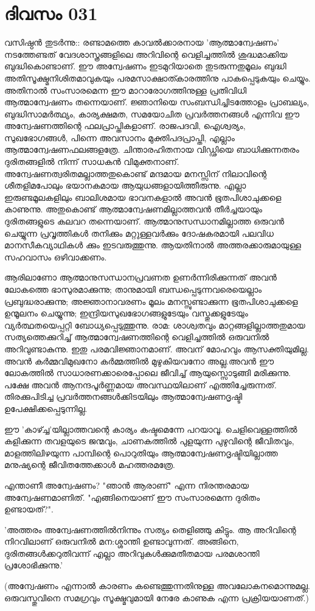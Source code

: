 \newpage
\section{ദിവസം 031}


വസിഷ്ഠന്‍ തുടര്‍ന്നു:: രണ്ടാമത്തെ കാവല്‍ക്കാരനായ 'ആത്മാന്വേഷണം' നടത്തേണ്ടത്‌ വേദശാസ്ത്രങ്ങളിലെ അറിവിന്റെ വെളിച്ചത്തില്‍ ശുദ്ധമാക്കിയ ബുദ്ധികൊണ്ടാണ്‌. ഈ അന്വേഷണം ഇടമുറിയാതെ തുടരുന്നതുമൂലം ബുദ്ധി അതിസൂക്ഷ്മനിശിതമാവുകയും പരമസാക്ഷാത്കാരത്തിനു പാകപ്പെടുകയും ചെയ്യും. അതിനാല്‍ സംസാരമെന്ന ഈ മാറാരോഗത്തിനുള്ള പ്രതിവിധി ആത്മാന്വേഷണം തന്നെയാണ്‌. ജ്ഞാനിയെ സംബന്ധിച്ചിടത്തോളം പ്രാബല്യം, ബുദ്ധിസാമര്‍ത്ഥ്യം, കാര്യക്ഷമത, സമയോചിത പ്രവര്‍ത്തനങ്ങള്‍ എന്നിവ ഈ അന്വേഷണത്തിന്റെ ഫലപ്രാപ്തികളാണ്‌. രാജപദവി, ഐശ്വര്യം, സുഖഭോഗങ്ങള്‍, പിന്നെ അവസാനം മുക്തിപദപ്രാപ്തി, എല്ലാം ആത്മാന്വേഷണഫലങ്ങളത്രേ. ചിന്താരഹിതനായ വിഡ്ഢിയെ ബാധിക്കുന്നതരം ദുരിതങ്ങളില്‍ നിന്ന് സാധകന്‍ വിമുക്തനാണ്‌. അന്വേഷണത്വരിതമല്ലാത്തതുകൊണ്ട്‌ മന്ദമായ മനസ്സിന്‌ നിലാവിന്റെ ശീതളിമപോലും ഭയാനകമായ ആയുധങ്ങളായിത്തീരുന്നു. എല്ലാ ഇരുണ്ടമൂലകളിലും ബാലിശമായ ഭാവനകളാല്‍ അവന്‍ ഭൂതപിശാചുക്കളെ കാണുന്നു. അതുകൊണ്ട്‌ ആത്മാന്വേഷണമില്ലാത്തവന്‍ തീര്‍ച്ചയായും ദുരിതങ്ങളുടെ കലവറ തന്നെയാണ്‌. ആത്മാനുസന്ധാനമില്ലാത്ത ഒരുവന്‍ ചെയ്യുന്ന പ്രവൃത്തികള്‍ തനിക്കും മറ്റുള്ളവര്‍ക്കും ദോഷകരമായി പലവിധ മാനസീകവ്യാഥികള്‍ ക്കും ഇടവരുത്തുന്നു. ആയതിനാല്‍ അത്തരക്കാരുമായുള്ള സഹവാസം ഒഴിവാക്കണം.

ആരിലാണോ ആത്മാനുസന്ധാനപ്രവണത ഉണര്‍ന്നിരിക്കുന്നത്‌ അവന്‍ ലോകത്തെ ഭാസുരമാക്കുന്നു; താനുമായി ബന്ധപ്പെടുന്നവരെയെല്ലാം പ്രബുദ്ധരാക്കുന്നു; അജ്ഞാനാവരണം മൂലം മനസ്സുണ്ടാക്കുന്ന ഭൂതപിശാചുക്കളെ ഉന്മൂലനം ചെയ്യുന്നു; ഇന്ദ്രിയസുഖഭോഗങ്ങളുടേയും വസ്തുക്കളുടേയും വ്യര്‍ത്ഥതയെപ്പറ്റി ബോധ്യപ്പെടുത്തുന്നു. രാമ: ശാശ്വതവും മാറ്റങ്ങളില്ലാത്തതുമായ സത്യത്തെക്കുറിച്ച്‌ ആത്മാന്വേഷണത്തിന്റെ വെളിച്ചത്തില്‍ ഒരുവനില്‍ അറിവുണ്ടാകുന്നു. ഇതു പരമവിജ്ഞാനമാണ്‌. അവന്‌ മോഹവും ആസക്തിയുമില്ല. അവന്‍ കര്‍മ്മവിമുഖനോ കര്‍മ്മത്തില്‍ മുഴുകിയവനോ അല്ല.അവന്‍ ഈ ലോകത്തില്‍ സാധാരണക്കാരെപ്പോലെ ജീവിച്ച്‌ ആയുസ്സൊടുങ്ങി മരിക്കുന്നു. പക്ഷേ അവന്‍ ആനന്ദപൂര്‍ണ്ണമായ അവസ്ഥയിലാണ്‌ എത്തിച്ചേരുന്നത്‌. തിരക്കുപിടിച്ച പ്രവര്‍ത്തനങ്ങള്‍ക്കിടയിലും ആത്മാന്വേഷണദൃഷ്ടി ഉപേക്ഷിക്കപ്പെടുന്നില്ല. 

ഈ 'കാഴ്ച്ച'യില്ലാത്തവന്റെ കാര്യം കഷ്ടമെന്നേ പറയാവൂ. ചെളിവെള്ളത്തില്‍ കളിക്കുന്ന തവളയുടെ ജന്മവും, ചാണകത്തില്‍ പുളയുന്ന പുഴുവിന്റെ ജീവിതവും, മാളത്തിലിഴയുന്ന പാമ്പിന്റെ പൊറുതിയും ആത്മാന്വേഷണദൃഷ്ടിയില്ലാത്ത മനുഷ്യന്റെ ജീവിതത്തേക്കാള്‍ മഹത്തരമത്രേ. 

എന്താണീ അന്വേഷണം? "ഞാന്‍ ആരാണ്‌" എന്ന നിരന്തരമായ അന്വേഷണമാണിത്‌. "എങ്ങിനെയാണ്‌ ഈ സംസാരമെന്ന ദുരിതം ഉണ്ടായത്‌?". 

'അത്തരം അന്വേഷണത്തില്‍നിന്നും സത്യം തെളിഞ്ഞു കിട്ടും. ആ അറിവിന്റെ നിറവിലാണ്‌ ഒരുവനില്‍ മന:ശ്ശാന്തി ഉണ്ടാവുന്നത്‌. അങ്ങിനെ, ദുരിതങ്ങള്‍ക്കറുതിവന്ന് എല്ലാ അറിവുകള്‍ക്കുമതീതമായ പരമശാന്തി പ്രശോഭിക്കുന്നു.'

(അന്വേഷണം എന്നാല്‍ കാരണം കണ്ടെത്തുന്നതിനുള്ള അവലോകനമൊന്നുമല്ല. ഒരുവസ്തുവിനെ സമഗ്രവും സൂക്ഷ്മവുമായി നേരേ കാണുക എന്ന പ്രക്രിയയാണത്‌.) 
